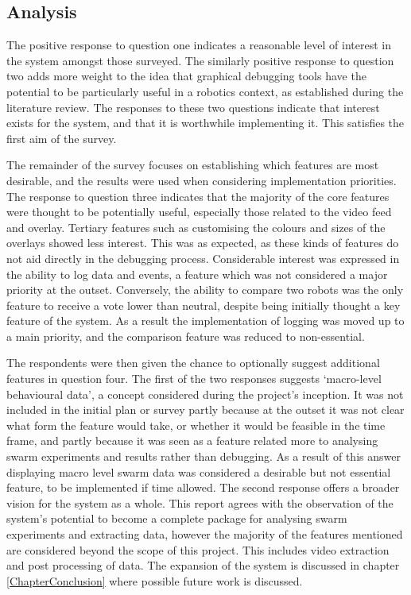 
\subsection{Analysis}
The positive response to question one indicates a reasonable level of interest in the system amongst those surveyed. The similarly positive response to question two adds more weight to the idea that graphical debugging tools have the potential to be particularly useful in a robotics context, as established during the literature review. The responses to these two questions indicate that interest exists for the system, and that it is worthwhile implementing it. This satisfies the first aim of the survey.

The remainder of the survey focuses on establishing which features are most desirable, and the results were used when considering implementation priorities. The response to question three indicates that the majority of the core features were thought to be potentially useful, especially those related to the video feed and overlay. Tertiary features such as customising the colours and sizes of the overlays showed less interest. This was as expected, as these kinds of features do not aid directly in the debugging process. Considerable interest was expressed in the ability to log data and events, a feature which was not considered a major priority at the outset. Conversely, the ability to compare two robots was the only feature to receive a vote lower than neutral, despite being initially thought a key feature of the system. As a result the implementation of logging was moved up to a main priority, and the comparison feature was reduced to non-essential.

The respondents were then given the chance to optionally suggest additional features in question four. The first of the two responses suggests `macro-level behavioural data', a concept considered during the project's inception. It was not included in the initial plan or survey partly because at the outset it was not clear what form the feature would take, or whether it would be feasible in the time frame, and partly because it was seen as a feature related more to analysing swarm experiments and results rather than debugging. As a result of this answer displaying macro level swarm data was considered a desirable but not essential feature, to be implemented if time allowed. The second response offers a broader vision for the system as a whole. This report agrees with the observation of the system's potential to become a complete package for analysing swarm experiments and extracting data, however the majority of the features mentioned are considered beyond the scope of this project. This includes video extraction and post processing of data. The expansion of the system is discussed in chapter \ref{ChapterConclusion} where possible future work is discussed.

